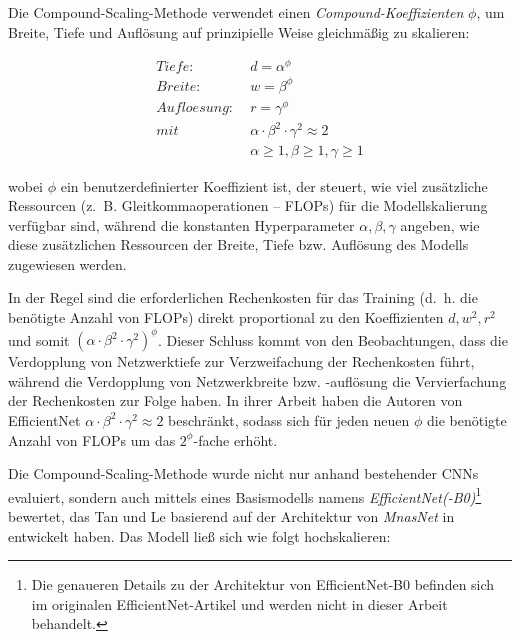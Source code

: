 Die Compound-Scaling-Methode verwendet einen \emph{Compound-Koeffizienten} $\phi$, um Breite, Tiefe und Auflösung auf prinzipielle Weise gleichmäßig zu skalieren:

\begin{equation} \label{eq:compoundscaling}
	\begin{split}
		Tiefe: &\; d = \alpha^\phi \\
		Breite: &\; w = \beta^\phi \\
		Aufloesung: &\; r = \gamma^\phi \\
		mit &\; \alpha\cdot\beta^2\cdot\gamma^2 \approx 2 \\
		&\; \alpha \geq 1, \beta \geq 1, \gamma \geq 1
	\end{split}
\end{equation}

wobei $\phi$ ein benutzerdefinierter Koeffizient ist, der steuert, wie viel zusätzliche Ressourcen (z.~B. Gleitkommaoperationen – FLOPs) für die Modellskalierung verfügbar sind, während die konstanten Hyperparameter $\alpha, \beta, \gamma$ angeben, wie diese zusätzlichen Ressourcen der Breite, Tiefe bzw. Auflösung des Modells zugewiesen werden. 

In der Regel sind die erforderlichen Rechenkosten für das Training (d.~h. die benötigte Anzahl von FLOPs) direkt proportional zu den Koeffizienten $d, w^2, r^2$ und somit $(\alpha\cdot\beta^2\cdot\gamma^2)^\phi$. Dieser Schluss kommt von den Beobachtungen, dass die Verdopplung von Netzwerktiefe zur Verzweifachung der Rechenkosten führt, während die Verdopplung von Netzwerkbreite bzw. -auflösung die Vervierfachung der Rechenkosten zur Folge haben. In ihrer Arbeit haben die Autoren von EfficientNet  $\alpha\cdot\beta^2\cdot\gamma^2 \approx 2$ beschränkt, sodass sich für jeden neuen $\phi$ die benötigte Anzahl von FLOPs um das $2^\phi$-fache erhöht.

Die Compound-Scaling-Methode wurde nicht nur anhand bestehender CNNs evaluiert, sondern auch mittels eines Basismodells namens \emph{EfficientNet(-B0)}\footnote{Die genaueren Details zu der Architektur von EfficientNet-B0 befinden sich im originalen EfficientNet-Artikel \cite{tan2020efficientnet} und werden nicht in dieser Arbeit behandelt.} bewertet, das Tan und Le basierend auf der Architektur von \emph{MnasNet} in \cite{tan2019mnasnet} entwickelt haben. Das Modell ließ sich wie folgt hochskalieren:

